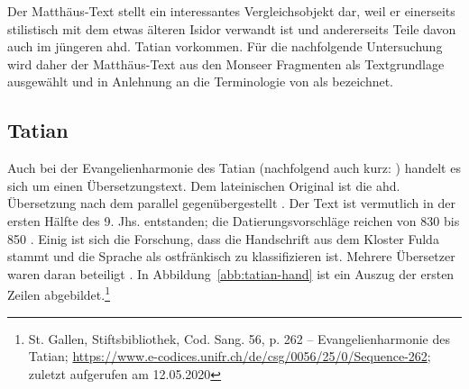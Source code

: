 


Der Matthäus-Text stellt ein interessantes Vergleichsobjekt dar, weil er  einerseits stilistisch mit dem etwas älteren Isidor verwandt ist \parencite{Hench1893,Lippert1974} und andererseits Teile davon auch im jüngeren ahd. Tatian vorkommen. Für die nachfolgende Untersuchung wird daher der Matthäus-Text aus den Monseer Fragmenten als Textgrundlage ausgewählt und in Anlehnung an die Terminologie von \textcite{Lippert1974} als  bezeichnet.
  
\subsection{Tatian}\label{sec:tatian}

Auch bei der Evangelienharmonie des Tatian (nachfolgend auch kurz: ) handelt es sich um einen Übersetzungstext. Dem lateinischen Original ist die ahd. Übersetzung nach dem  \parencite[43]{Fleischer2011} parallel gegenübergestellt \parencite[vgl. hierzu auch][128]{Masser1997}. Der Text ist vermutlich in der ersten Hälfte des 9. Jhs. entstanden; die Datierungsvorschläge reichen von 830 \parencite[LXX]{Sievers1961} bis 850 \parencite[127]{Sonderegger2003}. Einig ist sich die Forschung, dass die Handschrift aus dem Kloster Fulda stammt und die Sprache als ostfränkisch zu klassifizieren ist. Mehrere Übersetzer waren daran beteiligt \parencite[s.][31]{Masser1994}. In Abbildung~\ref{abb:tatian-hand} ist ein Auszug der ersten Zeilen abgebildet.\footnote{St. Gallen, Stiftsbibliothek, Cod. Sang. 56, p. 262 –
Evangelienharmonie des Tatian; \url{https://www.e-codices.unifr.ch/de/csg/0056/25/0/Sequence-262}; zuletzt aufgerufen am 12.05.2020}

